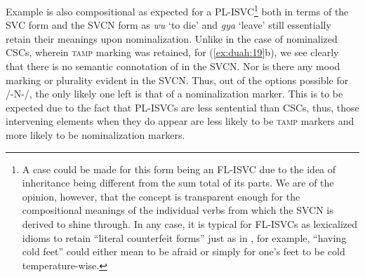 \documentclass[output=paper]{../langsci/langscibook}
\begin{document}

Example  is also compositional as expected for a PL-ISVC\footnote{A case could be made for this form being an FL-ISVC due to the idea of inheritance being different from the sum total of its parts. We are of the opinion, however, that the concept is transparent enough for the compositional meanings of the individual verbs from which the SVCN is derived to shine through. In any case, it is typical for FL-ISVCs as lexicalized idioms to retain “literal counterfeit forms” just as in , for example, “having cold feet” could either mean to be afraid or simply for one’s feet to be cold temperature-wise.} both in terms of the SVC form and the SVCN form as \textit{wu} ‘to die’ and \textit{gya} ‘leave’ still essentially retain their meanings upon nominalization. Unlike in the case of nominalized CSCs, wherein \textsc{tamp} marking was retained, for (\ref{ex:duah:19}b), we see clearly that there is no semantic connotation of  in the SVCN. Nor is there any mood marking or plurality evident in the SVCN. Thus, out of the options possible for /-N-/, the only likely one left is that of a nominalization marker. This is to be expected due to the fact that PL-ISVCs are less sentential than CSCs, thus, those intervening elements when they do appear are less likely to be \textsc{tamp} markers and more likely to be nominalization markers.
\end{document}
